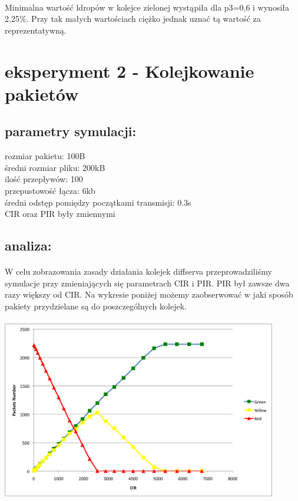 \documentclass[a4paper]{article}
\begin{document}
\paragraph{}
Minimalna wartość ldropów w kolejce zielonej wystąpiła dla p3=0,6 i wynosiła 2,25\%. Przy tak małych wartościach ciężko jednak uznać tą wartość za reprezentatywną.



\section{eksperyment 2 - Kolejkowanie pakietów}

\subsection{parametry symulacji:}

rozmiar pakietu: 100B\\
średni rozmiar pliku: 200kB\\
ilość przepływów: 100\\
przepustowość łącza: 6kb\\
średni odstęp pomiędzy początkami transmisji: 0.3s\\
CIR oraz PIR były zmiennymi\\
\subsection{analiza:}

\paragraph{}
W celu zobrazowania zasady działania kolejek diffserva przeprowadziliśmy symulacje przy zmieniających się parametrach CIR i PIR. PIR był zawsze dwa razy większy od CIR.
Na wykresie poniżej możemy zaobserwować w jaki sposób pakiety przydzielane są do poszczególnych kolejek.\\
\\



\includegraphics[width=120mm]{images/punkt_2_wykres.png}
\end{document}
